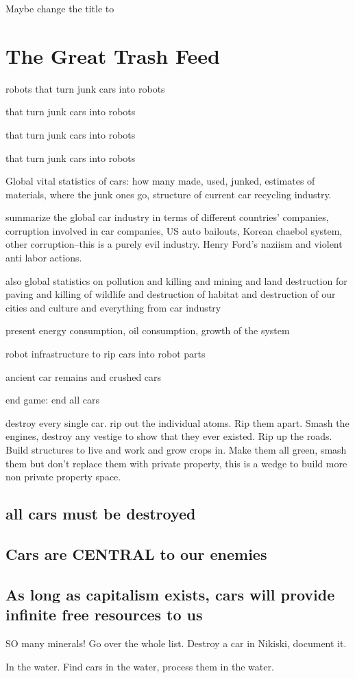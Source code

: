 Maybe change the title to

\section{The Great Trash Feed}\label{the-great-trash-feed}

robots that turn junk cars into robots

that turn junk cars into robots

that turn junk cars into robots

that turn junk cars into robots

Global vital statistics of cars: how many made, used, junked, estimates
of materials, where the junk ones go, structure of current car recycling
industry.

summarize the global car industry in terms of different countries'
companies, corruption involved in car companies, US auto bailouts,
Korean chaebol system, other corruption--this is a purely evil industry.
Henry Ford's naziism and violent anti labor actions.

also global statistics on pollution and killing and mining and land
destruction for paving and killing of wildlife and destruction of
habitat and destruction of our cities and culture and everything from
car industry

present energy consumption, oil consumption, growth of the system

robot infrastructure to rip cars into robot parts

ancient car remains and crushed cars

end game: end all cars

destroy every single car. rip out the individual atoms. Rip them apart.
Smash the engines, destroy any vestige to show that they ever existed.
Rip up the roads. Build structures to live and work and grow crops in.
Make them all green, smash them but don't replace them with private
property, this is a wedge to build more non private property space.

\subsection{all cars must be
destroyed}\label{all-cars-must-be-destroyed}

\subsection{Cars are CENTRAL to our
enemies}\label{cars-are-central-to-our-enemies}

\subsection{As long as capitalism exists, cars will provide infinite
free resources to
us}\label{as-long-as-capitalism-exists-cars-will-provide-infinite-free-resources-to-us}

SO many minerals! Go over the whole list. Destroy a car in Nikiski,
document it.

In the water. Find cars in the water, process them in the water.
